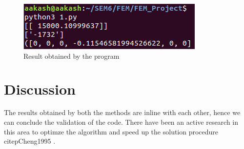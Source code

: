 \documentclass{article}
\begin{document}
\begin{figure}[h!]
\centering
\includegraphics[scale=.6]{11.png}
\caption{Result obtained by the program}
\label{fig:fig1}
\end{figure}


\section{Discussion}
The results obtained by both the methods are inline with each other, hence we can conclude the validation of the code. There have been an active research in this area to optimze the algorithm and speed up the solution procedure citep{Cheng1995} 
\citep{He_2017} \citep{Wei}.





\end{document}
